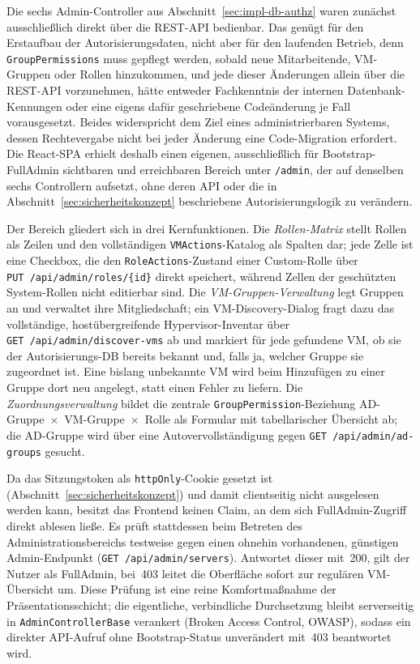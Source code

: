 \documentclass[12pt,a4paper]{article}
\begin{document}
Die sechs Admin-Controller aus Abschnitt~\ref{sec:impl-db-authz} waren zunächst ausschließlich direkt über die REST-API bedienbar. Das genügt für den Erstaufbau der Autorisierungsdaten, nicht aber für den laufenden Betrieb, denn \texttt{GroupPermissions} muss gepflegt werden, sobald neue Mitarbeitende, VM-Gruppen oder Rollen hinzukommen, und jede dieser Änderungen allein über die REST-API vorzunehmen, hätte entweder Fachkenntnis der internen Datenbank-Kennungen oder eine eigens dafür geschriebene Codeänderung je Fall vorausgesetzt. Beides widerspricht dem Ziel eines administrierbaren Systems, dessen Rechtevergabe nicht bei jeder Änderung eine Code-Migration erfordert. Die React-SPA erhielt deshalb einen eigenen, ausschließlich für Bootstrap-FullAdmin sichtbaren und erreichbaren Bereich unter \texttt{/admin}, der auf denselben sechs Controllern aufsetzt, ohne deren API oder die in Abschnitt~\ref{sec:sicherheitskonzept} beschriebene Autorisierungslogik zu verändern.

Der Bereich gliedert sich in drei Kernfunktionen. Die \emph{Rollen-Matrix} stellt Rollen als Zeilen und den vollständigen \texttt{VMActions}-Katalog als Spalten dar; jede Zelle ist eine Checkbox, die den \texttt{RoleActions}-Zustand einer Custom-Rolle über \texttt{PUT~/api/admin/roles/\{id\}} direkt speichert, während Zellen der geschützten System-Rollen nicht editierbar sind. Die \emph{VM-Gruppen-Verwaltung} legt Gruppen an und verwaltet ihre Mitgliedschaft; ein VM-Discovery-Dialog fragt dazu das vollständige, hostübergreifende Hypervisor-Inventar über \texttt{GET~/api/admin/discover-vms} ab und markiert für jede gefundene VM, ob sie der Autorisierungs-DB bereits bekannt und, falls ja, welcher Gruppe sie zugeordnet ist. Eine bislang unbekannte VM wird beim Hinzufügen zu einer Gruppe dort neu angelegt, statt einen Fehler zu liefern. Die \emph{Zuordnungsverwaltung} bildet die zentrale \texttt{GroupPermission}-Beziehung AD-Gruppe~$\times$~VM-Gruppe~$\times$~Rolle als Formular mit tabellarischer Übersicht ab; die AD-Gruppe wird über eine Autovervollständigung gegen \texttt{GET~/api/admin/ad-groups} gesucht.

Da das Sitzungstoken als \texttt{httpOnly}-Cookie gesetzt ist (Abschnitt~\ref{sec:sicherheitskonzept}) und damit clientseitig nicht ausgelesen werden kann, besitzt das Frontend keinen Claim, an dem sich FullAdmin-Zugriff direkt ablesen ließe. Es prüft stattdessen beim Betreten des Administrationsbereichs testweise gegen einen ohnehin vorhandenen, günstigen Admin-Endpunkt (\texttt{GET~/api/admin/servers}). Antwortet dieser mit~200, gilt der Nutzer als FullAdmin, bei~403 leitet die Oberfläche sofort zur regulären VM-Übersicht um. Diese Prüfung ist eine reine Komfortmaßnahme der Präsentationsschicht; die eigentliche, verbindliche Durchsetzung bleibt serverseitig in \texttt{AdminControllerBase} verankert (Broken Access Control, OWASP), sodass ein direkter API-Aufruf ohne Bootstrap-Status unverändert mit~403 beantwortet wird.
\end{document}
